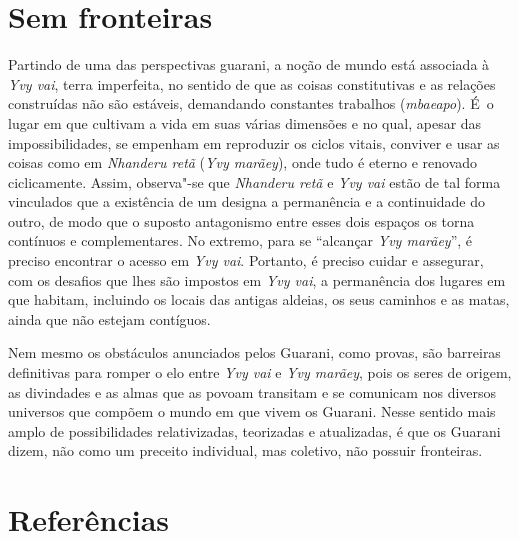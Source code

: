 \section{Sem fronteiras}

Partindo de uma das perspectivas guarani, a noção de mundo está
associada à \emph{Yvy vai}, terra imperfeita, no sentido de que as coisas
constitutivas e as relações construídas não são estáveis, demandando
constantes trabalhos (\emph{mbaeapo}). É~o lugar em que cultivam a vida em
suas várias dimensões e no qual, apesar das impossibilidades, se
empenham em reproduzir os ciclos vitais, conviver e usar as coisas como
em \emph{Nhanderu retã} (\emph{Yvy marãey}), onde tudo é eterno e renovado
ciclicamente. Assim, observa"-se que \emph{Nhanderu retã} e \emph{Yvy vai} estão de
tal forma vinculados que a existência de um designa a permanência e a
continuidade do outro, de modo que o suposto antagonismo entre esses
dois espaços os torna contínuos e complementares. No extremo, para se
``alcançar \emph{Yvy marãey}'', é preciso encontrar o acesso em \emph{Yvy vai}.
Portanto, é preciso cuidar e assegurar, com os desafios que lhes são
impostos em \emph{Yvy vai}, a permanência dos lugares em que habitam,
incluindo os locais das antigas aldeias, os seus caminhos e as matas,
ainda que não estejam contíguos. 

Nem mesmo os obstáculos anunciados pelos Guarani, como provas, são
barreiras definitivas para romper o elo entre \emph{Yvy vai} e \emph{Yvy marãey},
pois os seres de origem, as divindades e as almas que as povoam
transitam e se comunicam nos diversos universos que compõem o mundo em
que vivem os Guarani. Nesse sentido mais amplo de possibilidades
relativizadas, teorizadas e atualizadas, é que os Guarani dizem, não
como um preceito individual, mas coletivo, não possuir fronteiras.

\section{Referências}

